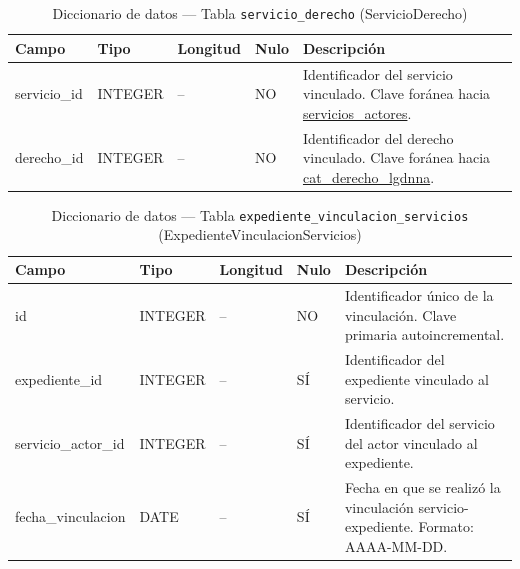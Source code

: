 \begin{table}[H]
	\centering
	\caption{Diccionario de datos --- Tabla \texttt{servicio\_derecho} (ServicioDerecho)}
	\label{tab:data-dict-servicio_derecho}
	\scriptsize
	\begin{tabular}{>{\ttfamily\raggedright\arraybackslash}p{3.6cm} p{1.6cm} p{1.3cm} p{0.7cm} p{5.6cm}}
		\toprule
		\textbf{Campo} & \textbf{Tipo} & \textbf{Longitud} & \textbf{Nulo} & \textbf{Descripción} \\
		\midrule
		servicio\_id & INTEGER & -- & NO & Identificador del servicio vinculado. Clave foránea hacia \hyperlink{ServiciosActores}{servicios\_actores}. \\
		derecho\_id & INTEGER & -- & NO & Identificador del derecho vinculado. Clave foránea hacia \hyperlink{CatDerechoLGDNNA}{cat\_derecho\_lgdnna}. \\
		\bottomrule
	\end{tabular}
\end{table}

\begin{table}[H]
	\centering
	\caption{Diccionario de datos --- Tabla \texttt{expediente\_vinculacion\_servicios} (ExpedienteVinculacionServicios)}
	\label{tab:data-dict-expediente_vinculacion_servicios}
	\scriptsize
	\begin{tabular}{>{\ttfamily\raggedright\arraybackslash}p{3.6cm} p{1.6cm} p{1.3cm} p{0.7cm} p{5.6cm}}
		\toprule
		\textbf{Campo} & \textbf{Tipo} & \textbf{Longitud} & \textbf{Nulo} & \textbf{Descripción} \\
		\midrule
		id & INTEGER & -- & NO & Identificador único de la vinculación. Clave primaria autoincremental. \\
		expediente\_id & INTEGER & -- & SÍ & Identificador del expediente vinculado al servicio. \\
		servicio\_actor\_id & INTEGER & -- & SÍ & Identificador del servicio del actor vinculado al expediente. \\
		fecha\_vinculacion & DATE & -- & SÍ & Fecha en que se realizó la vinculación servicio-expediente. Formato: AAAA-MM-DD. \\
		\bottomrule
	\end{tabular}
\end{table}

